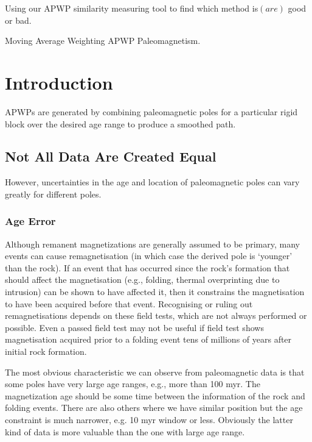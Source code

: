\begin{summary}
Using our APWP similarity measuring tool to find which method is$(are)$ good or
bad.
\end{summary}

\begin{keywords}
  Moving Average \textendash{} Weighting \textendash{} APWP \textendash{}
  Paleomagnetism.
\end{keywords}

\section{Introduction}

APWPs are generated by combining paleomagnetic poles for a particular rigid
block over the desired age range to produce a smoothed path.

\subsection{Not All Data Are Created Equal}

However, uncertainties in the age and location of paleomagnetic poles can vary
greatly for different poles.

\subsubsection{Age Error}

Although remanent magnetizations are generally assumed to be primary, many
events can cause remagnetisation (in which case the derived pole is `younger'
than the rock). If an event that has occurred since the rock's formation that
should affect the magnetisation (e.g., folding, thermal overprinting due to
intrusion) can be shown to have affected it, then it constrains the
magnetisation to have been acquired before that event. Recognising or ruling
out remagnetisations depends on these field tests, which are not always
performed or possible. Even a passed field test may not be useful if field test
shows magnetisation acquired prior to a folding event tens of millions of years
after initial rock formation.

The most obvious characteristic we can observe from paleomagnetic data is that
some poles have very large age ranges, e.g., more than 100 myr. The
magnetization age should be some time between the information of the rock and
folding events. There are also others where we have similar position but the
age constraint is much narrower, e.g. 10 myr window or less. Obviously the
latter kind of data is more valuable than the one with large age range.

